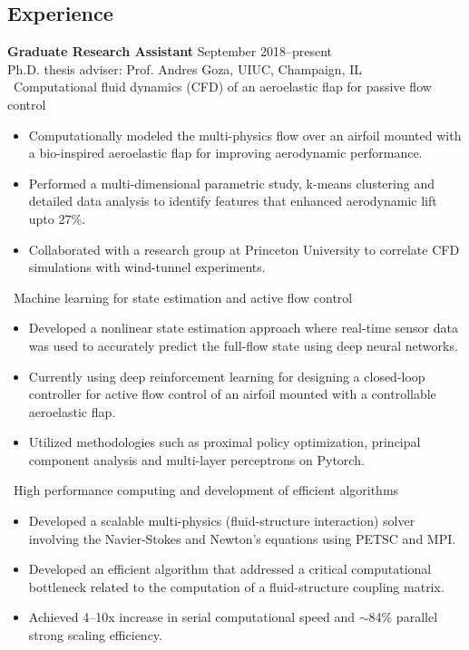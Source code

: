 \documentclass[margin]{res}
\begin{document}
\begin{resume}
\section{\large Experience}
{\bf Graduate Research Assistant} \hfill September 2018--present\\
Ph.D. thesis adviser: Prof. Andres Goza, UIUC, Champaign, IL  \\
%
{\textbullet\ Computational fluid dynamics (CFD) of an aeroelastic flap for passive flow control}
\begin{itemize}
	\item Computationally modeled the multi-physics flow over an airfoil mounted with a bio-inspired aeroelastic flap for improving aerodynamic performance.
	\item Performed a multi-dimensional parametric study, k-means clustering and detailed data analysis to identify features that enhanced aerodynamic lift upto 27\%.
	\item Collaborated with a research group at Princeton University to correlate CFD simulations with wind-tunnel experiments.
\end{itemize}

{\textbullet\  Machine learning for state estimation and active flow control}
\begin{itemize}
	\item Developed a nonlinear state estimation approach where real-time sensor data was used to accurately predict the full-flow state using deep neural networks.
	\item Currently using deep reinforcement learning for designing a closed-loop controller for active flow control of an airfoil mounted with a controllable aeroelastic flap.
	\item Utilized methodologies such as proximal policy optimization, principal component analysis and multi-layer perceptrons on Pytorch.
\end{itemize}

{\textbullet\  High performance computing and development of efficient algorithms}
\begin{itemize}
	\item Developed a scalable multi-physics (fluid-structure interaction) solver involving the Navier-Stokes and Newton's equations using PETSC and MPI. 
	\item Developed an efficient algorithm that addressed a critical computational bottleneck related to the computation of a fluid-structure coupling matrix.
	\item Achieved 4--10x increase in serial computational speed and $\sim$84\% parallel strong scaling efficiency.
\end{itemize}


\end{resume}
\end{document}
